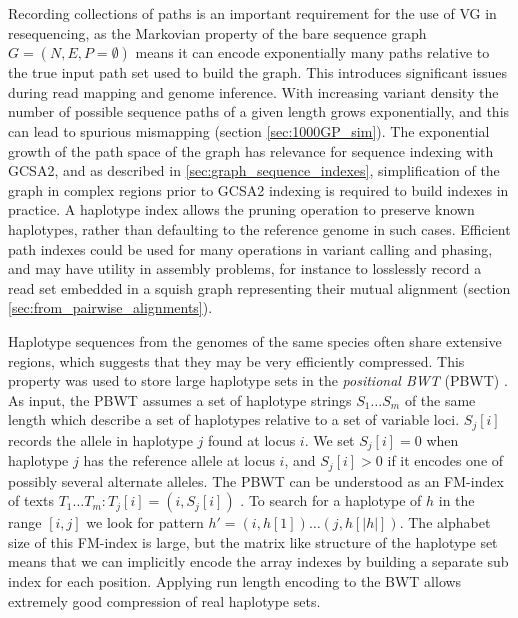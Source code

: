 Recording collections of paths is an important requirement for the use of VG in resequencing, as the Markovian property of the bare sequence graph $G = (N, E, P= \emptyset)$ means it can encode exponentially many paths relative to the true input path set used to build the graph.
This introduces significant issues during read mapping and genome inference.
With increasing variant density the number of possible sequence paths of a given length grows exponentially, and this can lead to spurious mismapping (section \ref{sec:1000GP_sim}).
The exponential growth of the path space of the graph has relevance for sequence indexing with GCSA2, and as described in \ref{sec:graph_sequence_indexes}, simplification of the graph in complex regions prior to GCSA2 indexing is required to build indexes in practice.
A haplotype index allows the pruning operation to preserve known haplotypes, rather than defaulting to the reference genome in such cases.
Efficient path indexes could be used for many operations in variant calling and phasing, and may have utility in assembly problems, for instance to losslessly record a read set embedded in a squish graph representing their mutual alignment (section \ref{sec:from_pairwise_alignments}).

Haplotype sequences from the genomes of the same species often share extensive regions, which suggests that they may be very efficiently compressed.
This property was used to store large haplotype sets in the \emph{positional BWT} (PBWT) \cite{durbin2014efficient}.
As input, the PBWT assumes a set of haplotype strings $S_1 \ldots S_m$ of the same length which describe a set of haplotypes relative to a set of variable loci.
$S_j[i]$ records the allele in haplotype $j$ found at locus $i$.
We set $S_j[i] = 0$ when haplotype $j$ has the reference allele at locus $i$, and $S_j[i] > 0$ if it encodes one of possibly several alternate alleles.
The PBWT can be understood as an FM-index of texts $T_1 \ldots T_m : T_j[i] = (i, S_j[i])$ \cite{gagie2017wheeler}.
To search for a haplotype of $h$ in the range $[i,j]$ we look for pattern $h' = (i, h[1]) \ldots (j, h[|h|])$.
The alphabet size of this FM-index is large, but the matrix like structure of the haplotype set means that we can implicitly encode the array indexes by building a separate sub index for each position.
Applying run length encoding to the BWT allows extremely good compression of real haplotype sets.

